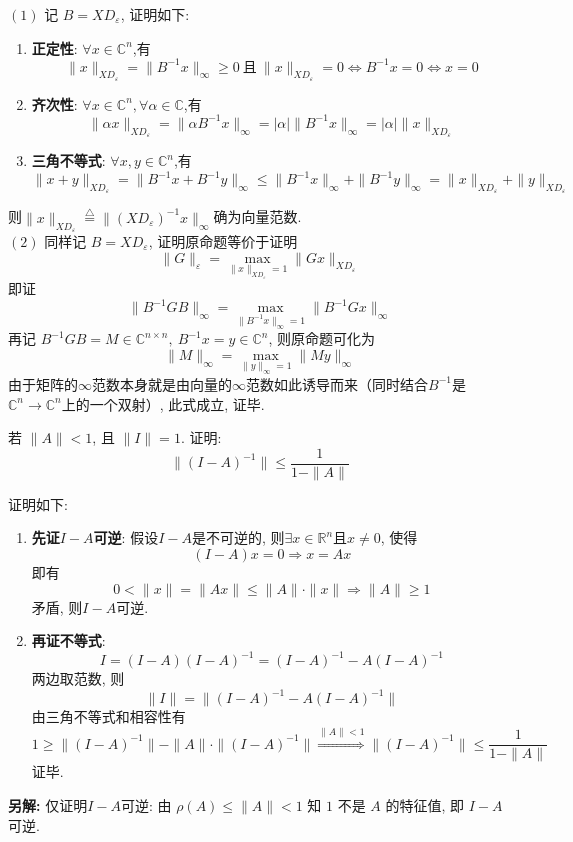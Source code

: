 \documentclass[12pt, answers]{exam}     %
\newcommand{\anothersolution}{\par\noindent\textbf{另解:}}
\newcommand{\R}{\mathbb{R}}
\newcommand{\C}{\mathbb{C}}
\begin{document}
\begin{questions}
\begin{solution}
$ \left( 1 \right) $ 记 $ B = XD_{\varepsilon} $, 证明如下:
\begin{enumerate}
    \item \textbf{正定性}: $\forall x \in \C^{n} $,有 \[ \|x\|_{XD_{\varepsilon}} = \|B^{-1}x\|_{\infty} \geq 0 \ \text{且} \ \|x\|_{XD_{\varepsilon}} = 0 \Leftrightarrow B^{-1}x = 0 \Leftrightarrow x = 0 \]
    \item \textbf{齐次性}: $\forall x \in \C^{n}, \forall \alpha \in \C$,有 \[ \|\alpha x\|_{XD_{\varepsilon}} = \|\alpha B^{-1}x\|_{\infty} = |\alpha| \|B^{-1}x\|_{\infty} = |\alpha| \|x\|_{XD_{\varepsilon}}\]
    \item \textbf{三角不等式}: $\forall x,y \in \C^{n} $,有 \[ \|x + y\|_{XD_{\varepsilon}} = \|B^{-1}x + B^{-1}y\|_{\infty} \leq \|B^{-1}x\|_{\infty} + \|B^{-1}y\|_{\infty} = \|x\|_{XD_{\varepsilon}} + \|y\|_{XD_{\varepsilon}} \]
\end{enumerate}
则$ \|x\|_{XD_\varepsilon} \overset{\triangle}{=} \|(XD_{\varepsilon})^{-1}x\|_{\infty} $确为向量范数. \\

$ \left( 2 \right) $ 同样记 $ B = XD_{\varepsilon} $, 
证明原命题等价于证明
\[
\|G\|_{\varepsilon} = \max_{\|x\|_{XD_\varepsilon} = 1} \|Gx\|_{XD_\varepsilon}
\]
即证
\[
\|B^{-1}GB\|_{\infty} = \max_{\|B^{-1}x\|_{\infty}= 1} \|B^{-1}Gx\|_{\infty}
\]
再记 $B^{-1}GB = M \in \mathbb{C}^{n \times n},\ B^{-1}x = y \in \C^n$, 则原命题可化为
\[
\|M\|_{\infty} = \max_{\|y\|_{\infty} = 1} \|My\|_{\infty}
\]
由于矩阵的$\infty$范数本身就是由向量的$\infty$范数如此诱导而来（同时结合$B^{-1}$是$\C^n \rightarrow \C^n$上的一个双射）, 此式成立, 证毕.
\end{solution}

\question{}
若 $\|A\|<1$, 且 $\|I\|=1$. 证明: \[ \|(I-A)^{-1}\|\leq\frac{1}{1-\|A\|} \]

\begin{solution}
证明如下:
\begin{enumerate}
\item \textbf{先证$I-A$可逆}: 假设$I-A$是不可逆的, 则$\exists x \in \R^n$且$x \neq 0$, 
使得\[ (I-A)x=0 \Rightarrow x=Ax \] 即有\[0<\|x\|=\|Ax\|\leq\|A\|\cdot\|x\| \Rightarrow \|A\|\geq 1\]
矛盾, 则$I-A$可逆.

\item \textbf{再证不等式}: \[ I=(I-A)(I-A)^{-1}=(I-A)^{-1}-A(I-A)^{-1} \]
两边取范数, 则 \[ \|I\|=\|(I-A)^{-1}-A(I-A)^{-1}\| \]
由三角不等式和相容性有 \[ 1 \geq \|(I-A)^{-1}\|-\|A\|\cdot\|(I-A)^{-1}\| \overset{\|A\| < 1}{\Longrightarrow} \|(I-A)^{-1}\| \leq \frac{1}{1-\|A\|} \]
证毕.
\end{enumerate}
\anothersolution{} 仅证明$I-A$可逆: 
由 $\rho(A)\leq\|A\|<1$ 知 \(1\) 不是 \(A\) 的特征值, 即 \(I - A\) 可逆.
\end{solution}


\end{questions}
\end{document}
